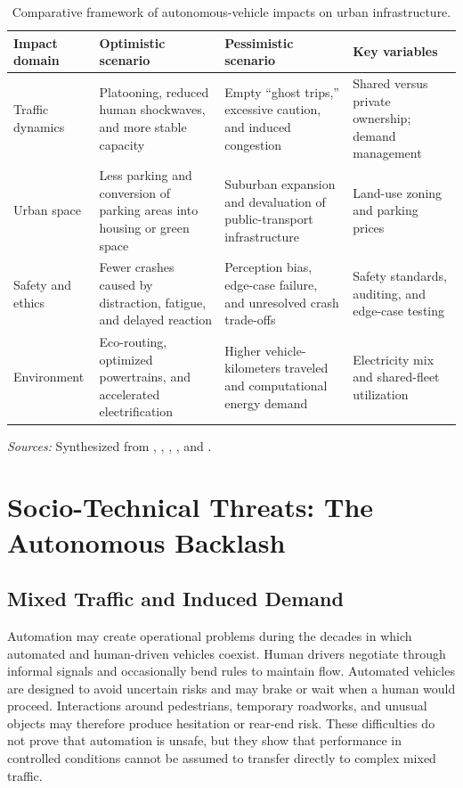 \documentclass[12pt,a4paper]{article}
\begin{document}
\begin{table}[htbp]
\centering
\caption{Comparative framework of autonomous-vehicle impacts on urban infrastructure.}
\label{tab:impacts}
\small
\begin{tabularx}{\textwidth}{@{}l Y Y Y@{}}
\toprule
Impact domain & Optimistic scenario & Pessimistic scenario & Key variables \\
\midrule
Traffic dynamics & Platooning, reduced human shockwaves, and more stable capacity & Empty ``ghost trips,'' excessive caution, and induced congestion & Shared versus private ownership; demand management \\
Urban space & Less parking and conversion of parking areas into housing or green space & Suburban expansion and devaluation of public-transport infrastructure & Land-use zoning and parking prices \\
Safety and ethics & Fewer crashes caused by distraction, fatigue, and delayed reaction & Perception bias, edge-case failure, and unresolved crash trade-offs & Safety standards, auditing, and edge-case testing \\
Environment & Eco-routing, optimized powertrains, and accelerated electrification & Higher vehicle-kilometers traveled and computational energy demand & Electricity mix and shared-fleet utilization \\
\bottomrule
\end{tabularx}

\vspace{0.4em}
\begin{minipage}{0.96\textwidth}
\footnotesize\emph{Sources:} Synthesized from \citet{anderson2016}, \citet{fagnant2015}, \citet{milakis2017}, \citet{nyholm2016}, and \citet{sperling2018}.
\end{minipage}
\end{table}

\section{Socio-Technical Threats: The Autonomous Backlash}

\subsection{Mixed Traffic and Induced Demand}

Automation may create operational problems during the decades in which automated and human-driven vehicles coexist. Human drivers negotiate through informal signals and occasionally bend rules to maintain flow. Automated vehicles are designed to avoid uncertain risks and may brake or wait when a human would proceed. Interactions around pedestrians, temporary roadworks, and unusual objects may therefore produce hesitation or rear-end risk. These difficulties do not prove that automation is unsafe, but they show that performance in controlled conditions cannot be assumed to transfer directly to complex mixed traffic.
\end{document}
